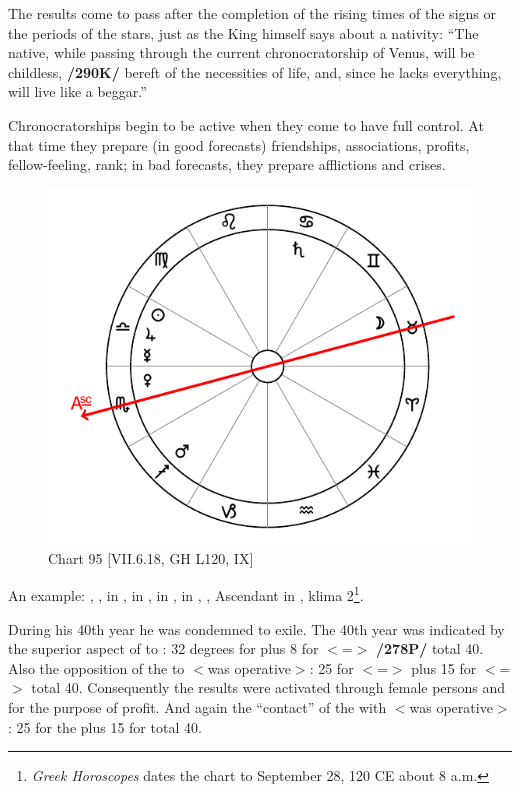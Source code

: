 The \mndl results come to pass after the completion of the rising times of the signs or the periods of the stars, just as the King himself says about a nativity: “The native, while passing through the current
chronocratorship of Venus, will be childless, \textbf{/290K/} bereft of the necessities of life, and, since he lacks everything, will live like a beggar.” 

Chronocratorships begin to be active when they come to have full
control. At that time they prepare (in good forecasts) friendships, associations, profits, fellow-feeling, rank; in bad forecasts, they prepare afflictions and crises.

\newpage
\begin{figure}
\centering
\vspace{0pt}
\includegraphics[width=.68\textwidth]{charts/7_6_18}
\caption{Chart 95 [VII.6.18, GH L120, IX] }
\label{fig:chart95}
\end{figure} 

An example: \Sun, \Jupiter, \Mercury\xspace in \Libra, \Moon\xspace in \Taurus, \Saturn\xspace in \Cancer, \Mars\xspace in \Sagittarius,
\Venus, Ascendant in \Scorpio, klima 2\footnote{\textit{Greek Horoscopes} dates the chart to September 28, 120 CE about 8 a.m.}.

During his 40th year he was condemned to exile. The 40th year
was indicated by the superior aspect of \Saturn\xspace to \Libra: 32 degrees for \Cancer\xspace plus 8 for \Libra\xspace $<$=\Venus$>$
\textbf{/278P/} total 40. Also the opposition of the \Moon\xspace to \Venus\xspace $<$was operative$>$: 25 for \Taurus\xspace $<$=\Moon$>$ plus 15 for \Scorpio\xspace $<$=\Mars$>$ total 40. Consequently the results were activated through female persons and
for the purpose of profit. And again the “contact” of the \Moon\xspace with \Mars\xspace $<$was operative$>$: 25 for the \Moon\xspace plus 15 for \Mars\xspace total 40.

